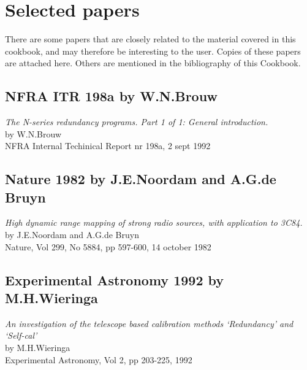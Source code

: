 
\chapter{ Selected papers}

There are some papers that are closely related to the material covered in this
cookbook, and may therefore be interesting to the user. Copies of these papers
are attached here. Others are mentioned in the bibliography of this Cookbook.

\section{NFRA ITR 198a by W.N.Brouw}

{\it The N-series redundancy programs. Part 1 of 1: General introduction.}
\\by W.N.Brouw
\\NFRA Internal Techinical Report nr 198a, 2 sept 1992

\section{Nature 1982 by J.E.Noordam and A.G.de Bruyn}

{\it High dynamic range mapping of strong radio sources,
with application to 3C84.}
\\by J.E.Noordam and A.G.de Bruyn
\\Nature, Vol 299, No 5884, pp 597-600, 14 october 1982


\section{Experimental Astronomy 1992 by M.H.Wieringa}

{\it An investigation of the telescope based calibration methods
`Redundancy' and `Self-cal'}
\\by M.H.Wieringa
\\Experimental Astronomy, Vol 2, pp 203-225, 1992

